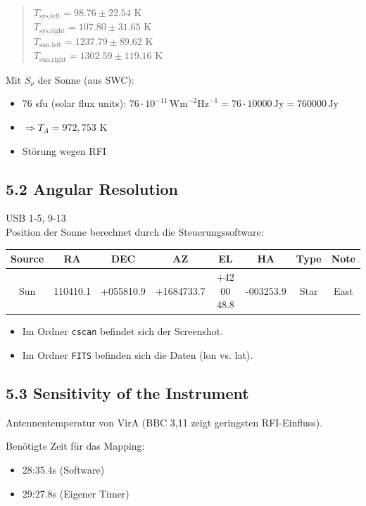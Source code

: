 \begin{quote}
$T_{\text{sys,left}} = 98.76 \pm 22.54 \text{ K}$ \\
$T_{\text{sys,right}} = 107.80 \pm 31.65 \text{ K}$ \\
$T_{\text{sun,left}} = 1237.79 \pm 89.62 \text{ K}$ \\
$T_{\text{sun,right}} = 1302.59 \pm 119.16 \text{ K}$
\end{quote}

Mit $S_{\nu}$ der Sonne (aus SWC):
\begin{itemize}
    \item 76 sfu (solar flux units): $76 \cdot 10^{-11} \, \text{Wm}^{-2}\text{Hz}^{-1} = 76 \cdot 10000 \, \text{Jy} = 760000 \, \text{Jy}$
    \item $\Rightarrow T_A = 972,753 \text{ K}$
    \item Störung wegen RFI
\end{itemize}

\subsection*{5.2 Angular Resolution}
USB 1-5, 9-13 \\
Position der Sonne berechnet durch die Steuerungssoftware:

\begin{table}[htbp]
\centering
\begin{tabular}{cccccccc}
\toprule
Source & RA & DEC & AZ & EL & HA & Type & Note \\
\midrule
Sun & 110410.1 & +055810.9 & +1684733.7 & +42 00 48.8 & -003253.9 & Star & East \\
\bottomrule
\end{tabular}
\end{table}

\begin{itemize}
    \item Im Ordner \texttt{cscan} befindet sich der Screenshot.
    \item Im Ordner \texttt{FITS} befinden sich die Daten (lon vs. lat).
\end{itemize}

\subsection*{5.3 Sensitivity of the Instrument}
Antennentemperatur von VirA (BBC 3,11 zeigt geringsten RFI-Einfluss).

Benötigte Zeit für das Mapping:
\begin{itemize}
    \item 28:35.4s (Software)
    \item 29:27.8s (Eigener Timer)
\end{itemize}


